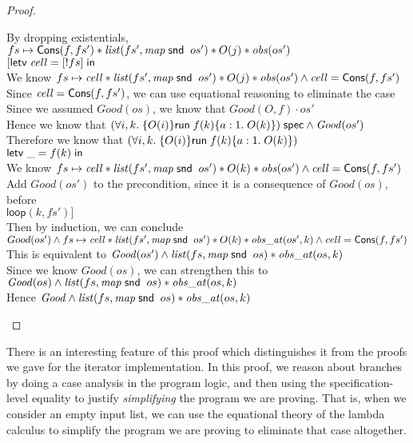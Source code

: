 \begin{proof}
\begin{tabbedproof}
\ooo By dropping existentials, $fs \mapsto \mathsf{Cons}(f, fs') * \mathit{list}(fs',  \mathit{map}\;\mathsf{snd}\;\;os') * O(j) * \mathit{obs}( os')$ \\
\ooo $[\mathsf{letv}\;\mathit{cell} = [!fs]\;\mathsf{in}\;$ \\
\ooo We know $fs \mapsto \mathit{cell}  * \mathit{list}(fs',  \mathit{map}\;\mathsf{snd}\;\;os') * O(j) * \mathit{obs}( os') \land \mathit{cell} = \mathsf{Cons}(f, fs')$ \\
\ooo Since $\mathit{cell} = \mathsf{Cons}(f, fs')$, we can use equational reasoning to eliminate the case \\
\ooo Since we assumed $\mathit{Good}(os)$, we know that $\mathit{Good}{(O,f)\cdot os'}$ \\
\ooo Hence we know that ${(\forall i,k.\; \{{O(i)}\}{\mathsf{run}\;{f(k)}}\{{a:1}.\;{O(k)}\})}\;\mathsf{spec} \land \mathit{Good}(os')$ \\
\ooo Therefore we know that $(\forall i,k.\; \{{O(i)}\}{\mathsf{run}\;{f(k)}}\{{a:1}.\;{O(k)}\})$ \\
\ooo $\mathsf{letv}\;\mathit{\_} = f(k)\;\mathsf{in}\;$ \\
\ooo We know $fs \mapsto \mathit{cell}  * \mathit{list}(fs',  \mathit{map}\;\mathsf{snd}\;\;os') * O(k) * \mathit{obs}( os') \land \mathit{cell} = \mathsf{Cons}(f, fs')$ \\
\ooo Add $\mathit{Good}(os')$ to the precondition, since it is a consequence of $\mathit{Good}(os)$, before\\
\ooo $\mathsf{loop}(k, fs')]$\\
\ooo Then by induction, we can conclude \\
\ooo $Good(os') \land fs \mapsto \mathit{cell}  * \mathit{list}(fs',  \mathit{map}\;\mathsf{snd}\;\;os') * O(k) * \mathit{obs\_at}(os', k) \land \mathit{cell} = \mathsf{Cons}(f, fs')$ \\
\ooo This is equivalent to $\mathit{Good}(os') \land \mathit{list}(fs, \mathit{map}\;\mathsf{snd}\;\;os) * \mathit{obs\_at}(os, k)$ \\
\ooo Since we know $\mathit{Good}(os)$, we can strengthen this to  \\
\ooo  $\mathit{Good}(os) \land \mathit{list}(fs, \mathit{map}\;\mathsf{snd}\;\;os) * \mathit{obs\_at}(os, k)$ \\
\oo Hence $\mathit{Good} \land \mathit{list}(fs, \mathit{map}\;\mathsf{snd}\;\;os) * \mathit{obs\_at}(os, k)$
\end{tabbedproof}
\end{proof}

There is an interesting feature of this proof which distinguishes it
from the proofs we gave for the iterator implementation. In this
proof, we reason about branches by doing a case analysis in the
program logic, and then using the specification-level equality to
justify \emph{simplifying} the program we are proving. That is, when
we consider an empty input list, we can use the equational theory of
the lambda calculus to simplify the program we are proving to
eliminate that case altogether.


